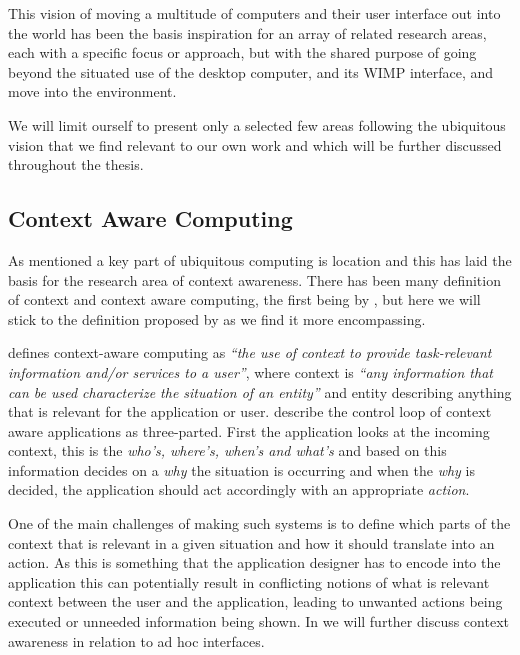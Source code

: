 This vision of moving a multitude of computers and their user interface out into the world has been the basis inspiration for an array of related research areas, each with a specific focus or approach, but with the shared purpose of going beyond the situated use of the desktop computer, and its WIMP interface, and move into the environment.

We will limit ourself to present only a selected few areas following the ubiquitous vision that we find relevant to our own work and which will be further discussed throughout the thesis.

\subsection{Context Aware Computing}
As mentioned a key part of ubiquitous computing is location and this has laid the basis for the research area of context awareness.
There has been many definition of context and context aware computing, the first being by \citet{schilit1994context}, but here we will stick to the definition proposed by \citeauthor{abowd1999towards} as we find it more encompassing. 

\citet{abowd1999towards} defines context-aware computing as \emph{``the use of context to
provide task-relevant information and/or services to a user''}, where context is \emph{``any information that can be used characterize the situation of an entity''} and entity describing anything that is relevant for the application or user.
\citeauthor{abowd1999towards} describe the control loop of context aware applications as three-parted. 
First the application looks at the incoming context, this is the \emph{who's, where's, when's and what's} and based on this information decides on a \emph{why} the situation is occurring and when the \emph{why} is decided, the application should act accordingly with an appropriate \emph{action}.

One of the main challenges of making such systems is to define which parts of the context that is relevant in a given situation and how it should translate into an action. 
As this is something that the application designer has to encode into the application this can potentially result in conflicting notions of what is relevant context between the user and the application, leading to unwanted actions being executed or unneeded information being shown.
In  we will further discuss context awareness in relation to ad hoc interfaces. 

